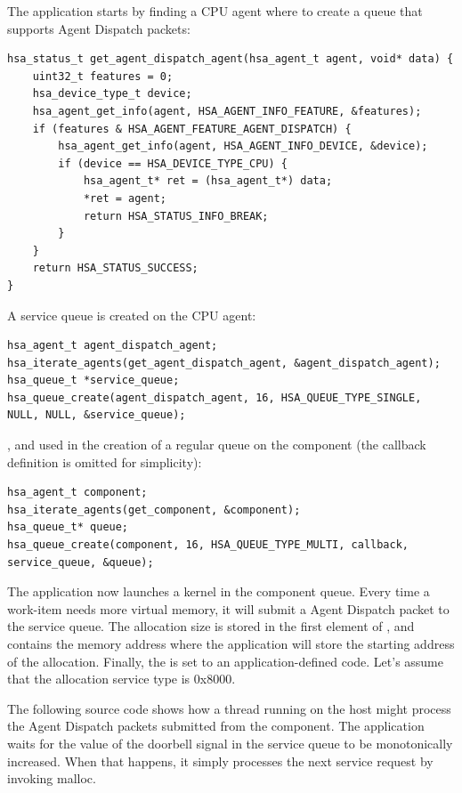 \documentclass[final]{book}
\begin{document}
The application starts by finding a CPU agent where to create a queue that
supports Agent Dispatch packets:
\begin{lstlisting}
hsa_status_t get_agent_dispatch_agent(hsa_agent_t agent, void* data) {
    uint32_t features = 0;
    hsa_device_type_t device;
    hsa_agent_get_info(agent, HSA_AGENT_INFO_FEATURE, &features);
    if (features & HSA_AGENT_FEATURE_AGENT_DISPATCH) {
        hsa_agent_get_info(agent, HSA_AGENT_INFO_DEVICE, &device);
        if (device == HSA_DEVICE_TYPE_CPU) {
            hsa_agent_t* ret = (hsa_agent_t*) data;
            *ret = agent;
            return HSA_STATUS_INFO_BREAK;
        }
    }
    return HSA_STATUS_SUCCESS;
}
\end{lstlisting}
A service queue is created on the CPU agent:
\begin{lstlisting}
hsa_agent_t agent_dispatch_agent;
hsa_iterate_agents(get_agent_dispatch_agent, &agent_dispatch_agent);
hsa_queue_t *service_queue;
hsa_queue_create(agent_dispatch_agent, 16, HSA_QUEUE_TYPE_SINGLE, NULL, NULL, &service_queue);
\end{lstlisting}
, and used in the creation of a regular queue on the component (the
callback definition is omitted for simplicity):
\begin{lstlisting}
hsa_agent_t component;
hsa_iterate_agents(get_component, &component);
hsa_queue_t* queue;
hsa_queue_create(component, 16, HSA_QUEUE_TYPE_MULTI, callback, service_queue, &queue);
\end{lstlisting}
The application now launches a kernel in the component queue. Every time a
work-item needs more virtual memory, it will submit a Agent Dispatch packet to
the service queue. The allocation size is stored in the first element of
, and
 contains the memory address
where the application will store the starting address of the
allocation. Finally, the  is set to an
application-defined code. Let's assume that the allocation service type is
0x8000.

The following source code shows how a thread running on the host might process
the Agent Dispatch packets submitted from the component. The application waits
for the value of the doorbell signal in the service queue to be monotonically
increased. When that happens, it simply processes the next service request by
invoking malloc.


\end{document}
